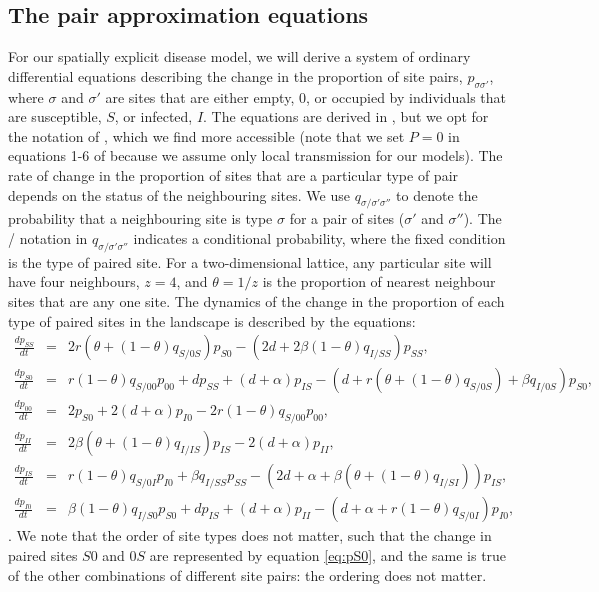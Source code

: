 \documentclass[11pt, oneside]{article}   	%
\begin{document}
\subsection{The pair approximation equations}
For our spatially explicit disease model, we will derive a system of ordinary differential equations describing the change in the proportion of site pairs, $p_{\sigma \sigma'}$, where $\sigma$ and $\sigma'$ are sites that are either empty, $0$, or occupied by individuals that are susceptible, $S$, or infected, $I$. The equations are derived in \cite{sato}, but we opt for the notation of \cite{boots}, which we find more accessible (note that we set $P = 0$ in equations 1-6 of \cite{boots} because we assume only local transmission for our models). The rate of change in the proportion of sites that are a particular type of pair depends on the status of the neighbouring sites. We use $q_{\sigma / \sigma' \sigma''}$ to denote the probability that a neighbouring site is type $\sigma$ for a pair of sites ($\sigma'$ and $\sigma''$). The / notation in $q_{\sigma / \sigma' \sigma''}$ indicates a conditional probability, where the fixed condition is the type of paired site. For a two-dimensional lattice, any particular site will have four neighbours, $z=4$, and $\theta = 1/z$ is the proportion of nearest neighbour sites that are any one site. The dynamics of the change in the proportion of each type of paired sites in the landscape is described by the equations:
%
\begin{eqnarray}
\frac{dp_{SS}}{dt} & = & 2r(\theta + (1-\theta)q_{S/0S})p_{S0} - (2d + 2\beta(1-\theta)q_{I/SS})p_{SS},\label{eq:pSS}\\
\frac{dp_{S0}}{dt} & = & r(1 - \theta)q_{S/00}p_{00} + dp_{SS} + (d+\alpha)p_{IS} - (d +r(\theta + (1-\theta)q_{S/0S})+\beta q_{I/0S})p_{S0},\label{eq:pS0}\\
\frac{dp_{00}}{dt} & = & 2p_{S0} + 2(d+\alpha)p_{I0} - 2r(1-\theta)q_{S/00}p_{00},\\
\frac{dp_{II}}{dt}& = & 2\beta(\theta + (1-\theta)q_{I/IS})p_{IS} - 2(d+\alpha)p_{II},\\
\frac{dp_{IS}}{dt}& = & r(1-\theta)q_{S/0I}p_{I0} + \beta q_{I/SS}p_{SS} - (2 d + \alpha + \beta(\theta + (1-\theta)q_{I/SI}))p_{IS},\\
\frac{dp_{I0}}{dt} & = & \beta (1 - \theta)q_{I/S0}p_{S0} + dp_{IS} + (d + \alpha)p_{II} - (d + \alpha+r(1-\theta)q_{S/0I})p_{I0},\label{eq:pI0}
\end{eqnarray}
%
\cite{sato, boots}. We note that the order of site types does not matter, such that the change in paired sites $S0$ and $0S$ are represented by equation \ref{eq:pS0}, and the same is true of the other combinations of different site pairs: the ordering does not matter.
\end{document}
